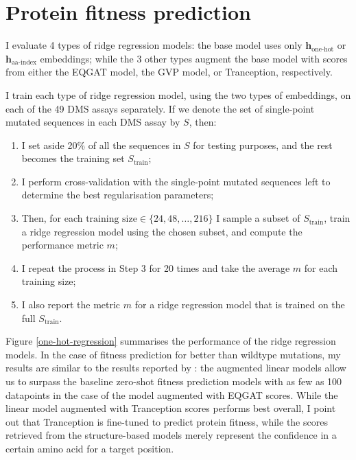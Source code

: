 \section{Protein fitness prediction}
\label{sec:protein-fitness-prediction}
I evaluate 4 types of ridge regression models: the base model uses only $\mathbf{h}_{\text{one-hot}}$ or $\mathbf{h}_{\text{aa-index}}$ embeddings; while the 3 other types augment the base model with scores from either the EQGAT model, the GVP model, or Tranception, respectively. 

I train each type of ridge regression model, using the two types of embeddings, on each of the 49 DMS assays separately. If we denote the set of single-point mutated sequences in each DMS assay by $S$, then:
\begin{enumerate}
    \item I set aside 20\% of all the sequences in $S$ for testing purposes, and the rest becomes the training set $S_\text{train}$;
    \item I perform cross-validation with the single-point mutated sequences left to determine the best regularisation parameters;
    \item Then, for each $\text{training size}\in\{24, 48, \dots, 216\}$ I sample a subset of $S_{\text{train}}$, train a ridge regression model using the chosen subset, and compute the performance metric $m$;
    \item I repeat the process in Step 3 for 20 times and take the average $m$ for each training size;
    \item I also report the metric $m$ for a ridge regression model that is trained on the full $S_{\text{train}}$. 
\end{enumerate}

Figure \ref{one-hot-regression} summarises the performance of the ridge regression models. In the case of fitness prediction for better than wildtype mutations, my results are similar to the results reported by \citet{chloe-hsu}: the augmented linear models allow us to surpass the baseline zero-shot fitness prediction models with as few as 100 datapoints in the case of the model augmented with EQGAT scores. While the linear model augmented with Tranception scores performs best overall, I point out that Tranception is fine-tuned to predict protein fitness, while the scores retrieved from the structure-based models merely represent the confidence in a certain amino acid for a target position.

